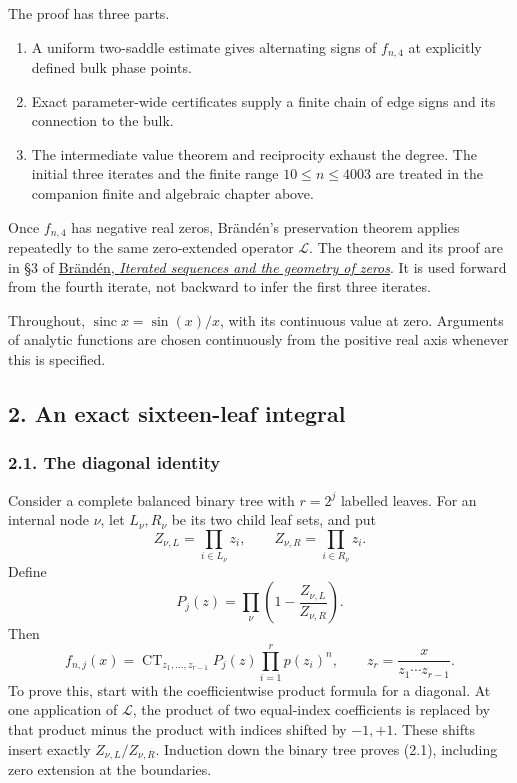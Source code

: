 \documentclass[
  11pt,
]{article}
\providecommand{\tightlist}{%
  \setlength{\itemsep}{0pt}\setlength{\parskip}{0pt}}
\begin{document}
The proof has three parts.

\begin{enumerate}
\def\labelenumi{\arabic{enumi}.}
\tightlist
\item
  A uniform two-saddle estimate gives alternating signs of \(f_{n,4}\)
  at explicitly defined bulk phase points.
\item
  Exact parameter-wide certificates supply a finite chain of edge signs
  and its connection to the bulk.
\item
  The intermediate value theorem and reciprocity exhaust the degree. The
  initial three iterates and the finite range \(10\le n\le4003\) are
  treated in the companion finite and algebraic chapter above.
\end{enumerate}

Once \(f_{n,4}\) has negative real zeros, Brändén's preservation theorem
applies repeatedly to the same zero-extended operator \(\mathcal L\).
The theorem and its proof are in §3 of
\href{https://arxiv.org/pdf/0909.1927}{Brändén, \emph{Iterated sequences
and the geometry of zeros}}. It is used forward from the fourth iterate,
not backward to infer the first three iterates.

Throughout, \(\operatorname{sinc}x=\sin(x)/x\), with its continuous
value at zero. Arguments of analytic functions are chosen continuously
from the positive real axis whenever this is specified.

\subsection{2. An exact sixteen-leaf
integral}\label{an-exact-sixteen-leaf-integral}

\subsubsection{2.1. The diagonal identity}\label{the-diagonal-identity}

Consider a complete balanced binary tree with \(r=2^j\) labelled leaves.
For an internal node \(\nu\), let \(L_\nu,R_\nu\) be its two child leaf
sets, and put \[
 Z_{\nu,L}=\prod_{i\in L_\nu}z_i,
 \qquad Z_{\nu,R}=\prod_{i\in R_\nu}z_i.
\] Define \[
 P_j(z)=\prod_{\nu}\left(1-\frac{Z_{\nu,L}}{Z_{\nu,R}}\right).
\] Then \[
 f_{n,j}(x)=\operatorname{CT}_{z_1,\ldots,z_{r-1}}
 P_j(z)\prod_{i=1}^r p(z_i)^n,
 \qquad z_r=\frac{x}{z_1\cdots z_{r-1}}.                 \tag{2.1}
\] To prove this, start with the coefficientwise product formula for a
diagonal. At one application of \(\mathcal L\), the product of two
equal-index coefficients is replaced by that product minus the product
with indices shifted by \(-1,+1\). These shifts insert exactly
\(Z_{\nu,L}/Z_{\nu,R}\). Induction down the binary tree proves (2.1),
including zero extension at the boundaries.
\end{document}
